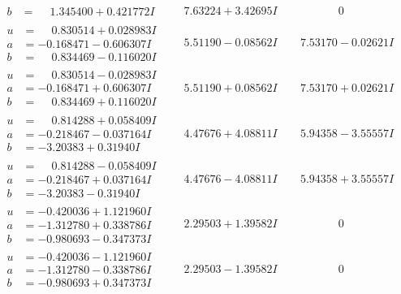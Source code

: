 \documentclass[1p]{elsarticle_modified}
\theoremstyle{definition}
\begin{document}
$$\begin{array}{c|c|c}
\begin{aligned}
b &= \phantom{-}1.345400 + 0.421772 I\end{aligned}
 & \phantom{-}7.63224 + 3.42695 I & \phantom{-0.000000 } 0 \\ \hline\begin{aligned}
u &= \phantom{-}0.830514 + 0.028983 I \\
a &= -0.168471 - 0.606307 I \\
b &= \phantom{-}0.834469 - 0.116020 I\end{aligned}
 & \phantom{-}5.51190 - 0.08562 I & \phantom{-}7.53170 - 0.02621 I \\ \hline\begin{aligned}
u &= \phantom{-}0.830514 - 0.028983 I \\
a &= -0.168471 + 0.606307 I \\
b &= \phantom{-}0.834469 + 0.116020 I\end{aligned}
 & \phantom{-}5.51190 + 0.08562 I & \phantom{-}7.53170 + 0.02621 I \\ \hline\begin{aligned}
u &= \phantom{-}0.814288 + 0.058409 I \\
a &= -0.218467 - 0.037164 I \\
b &= -3.20383 + 0.31940 I\end{aligned}
 & \phantom{-}4.47676 + 4.08811 I & \phantom{-}5.94358 - 3.55557 I \\ \hline\begin{aligned}
u &= \phantom{-}0.814288 - 0.058409 I \\
a &= -0.218467 + 0.037164 I \\
b &= -3.20383 - 0.31940 I\end{aligned}
 & \phantom{-}4.47676 - 4.08811 I & \phantom{-}5.94358 + 3.55557 I \\ \hline\begin{aligned}
u &= -0.420036 + 1.121960 I \\
a &= -1.312780 + 0.338786 I \\
b &= -0.980693 - 0.347373 I\end{aligned}
 & \phantom{-}2.29503 + 1.39582 I & \phantom{-0.000000 } 0 \\ \hline\begin{aligned}
u &= -0.420036 - 1.121960 I \\
a &= -1.312780 - 0.338786 I \\
b &= -0.980693 + 0.347373 I\end{aligned}
 & \phantom{-}2.29503 - 1.39582 I & \phantom{-0.000000 } 0 \\ \hline\begin{aligned}

\end{aligned}
\end{array}$$
\end{document}
